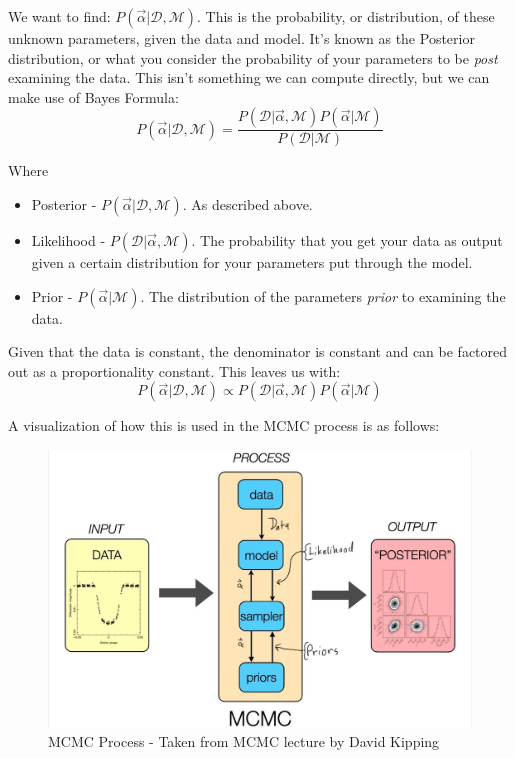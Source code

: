 \documentclass [letterpaper, 12pt] {article}
\begin{document}
We want to find: $P(\vec{\alpha} | \mathcal{D}, \mathcal{M})$. This is the probability, or distribution, of these unknown parameters, given the data and model. It's known as the Posterior distribution, or what you consider the probability of your parameters to be \textit{post} examining the data. This isn't something we can compute directly, but we can make use of Bayes Formula:
$$ P(\vec{\alpha} | \mathcal{D}, \mathcal{M}) = \frac{P(\mathcal{D} | \vec{\alpha}, \mathcal{M}) P(\vec{\alpha} | \mathcal{M})}{P(\mathcal{D} | \mathcal{M})}$$

Where
\begin{itemize}
	\item Posterior - $P(\vec{\alpha} | \mathcal{D}, \mathcal{M})$. As described above.
	\item Likelihood - $P(\mathcal{D} | \vec{\alpha}, \mathcal{M})$. The probability that you get your data as output given a certain distribution for your parameters put through the model.
	\item Prior - $P(\vec{\alpha} | \mathcal{M})$. The distribution of the parameters \textit{prior} to examining the data.
\end{itemize}
Given that the data is constant, the denominator is constant and can be factored out as a proportionality constant. This leaves us with:
$$ P(\vec{\alpha} | \mathcal{D}, \mathcal{M}) \propto P(\mathcal{D} | \vec{\alpha}, \mathcal{M}) P(\vec{\alpha} | \mathcal{M})$$

A visualization of how this is used in the MCMC process is as follows:

\begin{figure}[H]
	\centering
	\includegraphics[width=0.9\linewidth]{mcmc-diag-kipping}
	\caption{MCMC Process - Taken from MCMC lecture by David Kipping \cite{Kipping_2016}}
\end{figure}
\end{document}
